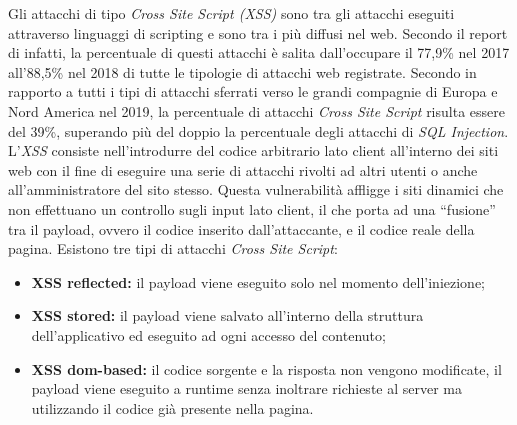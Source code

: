 \documentclass[
11pt, %
oneside, %
english, %
onehalfspacing,%
headsepline, %
]{MastersDoctoralThesis} %
\newcommand\citen[1]{\citeauthor{#1} \citep{#1}}
\begin{document}
Gli attacchi di tipo \emph{Cross Site Script (XSS)} sono tra gli attacchi eseguiti attraverso linguaggi di scripting e sono tra i più diffusi nel web. Secondo il report di \citen{PositiveTechnologiesReport} infatti, la percentuale di questi attacchi è salita dall'occupare il 77,9\% nel 2017 all'88,5\% nel 2018 di tutte le tipologie di attacchi web registrate. Secondo \citen{PreciseSecurityReport} in rapporto a tutti i tipi di attacchi sferrati verso le grandi compagnie di Europa e Nord America nel 2019, la percentuale di attacchi \emph{Cross Site Script} risulta essere del 39\%, superando più del doppio la percentuale degli attacchi di \emph{SQL Injection}.\\
L'\emph{XSS} consiste nell’introdurre del codice arbitrario lato client all'interno dei siti web con il fine di eseguire una serie di attacchi rivolti ad altri utenti o anche all'amministratore del sito stesso. Questa vulnerabilità affligge i siti dinamici che non effettuano un controllo sugli input lato client, il che porta ad una ``fusione'' tra il payload, ovvero il codice inserito dall'attaccante, e il codice reale della pagina. Esistono tre tipi di attacchi \emph{Cross Site Script}:
\begin{itemize}
  \item\textbf{XSS reflected:} il payload viene eseguito solo nel momento dell’iniezione;
  \item\textbf{XSS stored:} il payload viene salvato all'interno della struttura dell'applicativo ed eseguito ad ogni accesso del contenuto;
  \item\textbf{XSS dom-based:} il codice sorgente e la risposta non vengono modificate, il payload viene eseguito a runtime senza inoltrare richieste al server ma utilizzando il codice già presente nella pagina.
\end{itemize}



\printbibliography\
\end{document}
